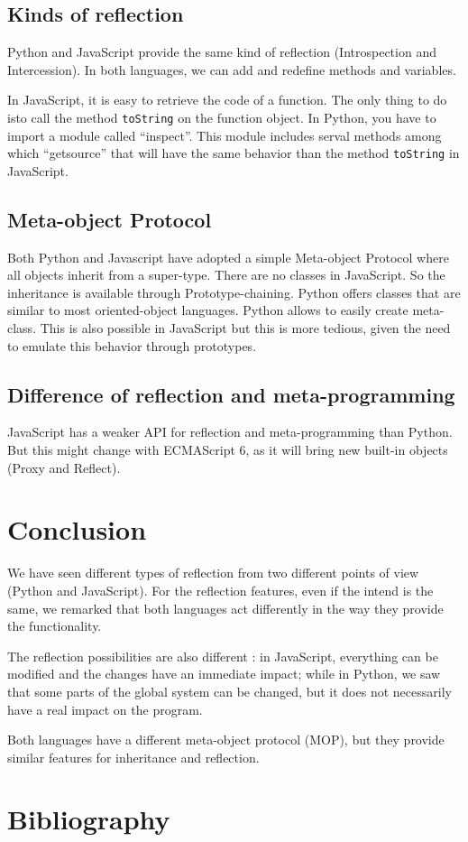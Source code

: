 \documentclass[a4paper,10pt]{article}
\begin{document}
\subsection{Kinds of reflection}

Python and JavaScript provide the same kind of reflection (Introspection and Intercession). In both languages, we can add and redefine methods and variables.

In JavaScript, it is easy to retrieve the code of a function. The only thing to do isto call the method \lstinline|toString| on the function object. In Python, you have to import a module called ``inspect''. This module includes serval methods among which ``getsource'' that will have the same behavior than the method \lstinline|toString| in JavaScript. 

\subsection{Meta-object Protocol}

Both Python and Javascript have adopted a simple Meta-object Protocol where all objects inherit from a super-type. There are no classes in JavaScript. So the inheritance is available through Prototype-chaining. Python offers classes that are similar to most oriented-object languages. Python allows to easily create meta-class. This is also possible in JavaScript but this is more tedious, given the need to emulate this behavior through prototypes.


\subsection{Difference of reflection and meta-programming}

JavaScript has a weaker API for reflection and meta-programming than Python. But this might change with ECMAScript 6, as it will bring new built-in objects (Proxy and Reflect).


\section{Conclusion}

We have seen different types of reflection from two different points of view (Python and JavaScript).
For the reflection features, even if the intend is the same, we remarked that both languages act differently in the way they provide the functionality.

The reflection possibilities are also different : in JavaScript, everything can be modified and the changes have an immediate impact; while in Python, we saw that some parts of the global system can be changed, but it does not necessarily have a real impact on the program.

Both languages have a different meta-object protocol (MOP), but they provide similar features for inheritance and reflection.


\section{Bibliography}
\end{document}
